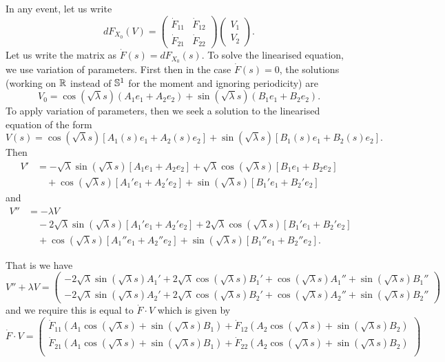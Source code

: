 \documentclass[12pt]{article}
\begin{document}
In any event, let us write
\[
dF_{X_0} (V) = \begin{pmatrix}
\dot{F}_{11} & \dot{F}_{12} \\
\dot{F}_{21} & \dot{F}_{22}
\end{pmatrix}
\begin{pmatrix}
V_1 \\
V_2
\end{pmatrix}.
\]
Let us write the matrix as \(\dot{F}(s) = dF_{X_0} (s)\). To solve the linearised equation, we use variation of parameters. First then in the case \(\dot{F}(s) = 0\), the solutions (working on \(\operatorname{\mathbb{R}}\) instead of \(\operatorname{\mathbb{S}^1}\) for the moment and ignoring periodicity) are
\[
V_0 = \cos(\sqrt{\lambda} s) (A_1 e_1 + A_2 e_2) + \sin(\sqrt{\lambda} s) (B_1 e_1 + B_2 e_2).
\]
To apply variation of parameters, then we seek a solution to the linearised equation of the form
\[
V(s) = \cos(\sqrt{\lambda} s) [A_1(s) e_1 + A_2(s) e_2] + \sin(\sqrt{\lambda} s) [B_1(s) e_1 + B_2(s) e_2].
\]
Then
\[
\begin{split}
V' &= -\sqrt{\lambda} \sin(\sqrt{\lambda} s) [A_1 e_1 + A_2 e_2] + \sqrt{\lambda} \cos(\sqrt{\lambda} s) [B_1 e_1 + B_2 e_2] \\
&\quad + \cos(\sqrt{\lambda} s) [A_1' e_1 + A_2' e_2] + \sin(\sqrt{\lambda} s) [B_1' e_1 + B_2' e_2]
\end{split}
\]
and
\[
\begin{split}
V'' &= -\lambda V \\
&\quad - 2 \sqrt{\lambda} \sin(\sqrt{\lambda} s)[A_1' e_1 + A_2' e_2] + 2 \sqrt{\lambda}\cos(\sqrt{\lambda} s) [B_1' e_1 + B_2' e_2] \\
&\quad + \cos(\sqrt{\lambda} s) [A_1'' e_1 + A_2'' e_2] + \sin(\sqrt{\lambda} s) [B_1'' e_1 + B_2'' e_2].
\end{split}
\]

That is we have
\[
V'' + \lambda V = \begin{pmatrix}
- 2 \sqrt{\lambda} \sin(\sqrt{\lambda} s) A_1' + 2 \sqrt{\lambda}\cos(\sqrt{\lambda} s) B_1' + \cos(\sqrt{\lambda} s) A_1'' + \sin(\sqrt{\lambda} s) B_1'' \\
- 2 \sqrt{\lambda} \sin(\sqrt{\lambda} s) A_2' + 2 \sqrt{\lambda}\cos(\sqrt{\lambda} s) B_2' + \cos(\sqrt{\lambda} s) A_2'' + \sin(\sqrt{\lambda} s) B_2''
\end{pmatrix}
\]
and we require this is equal to \(\dot{F} \cdot V\) which is given by
\[
\dot{F} \cdot V = \begin{pmatrix}
\dot{F}_{11} (A_1 \cos(\sqrt{\lambda} s) + \sin(\sqrt{\lambda} s) B_1) + \dot{F}_{12} (A_2 \cos(\sqrt{\lambda} s) + \sin(\sqrt{\lambda} s) B_2) \\
\dot{F}_{21} (A_1 \cos(\sqrt{\lambda} s) + \sin(\sqrt{\lambda} s) B_1) + \dot{F}_{22} (A_2 \cos(\sqrt{\lambda} s) + \sin(\sqrt{\lambda} s) B_2) \\
\end{pmatrix}
\]
\end{document}
